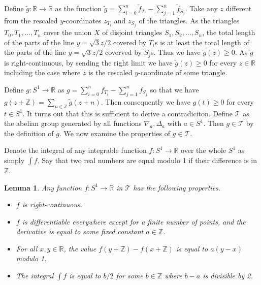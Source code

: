 \documentclass[a4paper]{amsart}
\theoremstyle{plain}
\newtheorem{lemma}{Lemma}
\theoremstyle{definition}
\begin{document}
Define \(\tilde{g} : \mathbb{R} \to \mathbb{R}\) as the function \(\tilde{g} = \sum_{i=0}^n \tilde{f}_{T_i} - \sum_{j=1}^n \tilde{f}_{S_j}\). Take any \(z\) different from the rescaled \(y\)-coordinates \(z_{T_i}\) and \(z_{S_j}\) of the triangles. As the triangles \(T_0, T_1, \dots, T_n\) cover the union \(X\) of disjoint triangles \(S_1, S_2, \dots, S_n\), the total length of the parts of the line \(y = \sqrt{3}z/2\) covered by \(T_i\)\textquotesingle s is at least the total length of the parts of the line \(y = \sqrt{3}z/2\) coverved by \(S_j\)\textquotesingle s. Thus we have \(\tilde{g}(z) \geq 0\). As \(\tilde{g}\) is right-continuous, by sending the right limit we have \(\tilde{g}(z) \geq 0\) for every \(z \in \mathbb{R}\) including the case where \(z\) is the rescaled \(y\)-coordinate of some triangle.

Define \(g : S^1 \to \mathbb{R}\) as \(g = \sum_{i=0}^n f_{T_i} - \sum_{j=1}^n f_{S_j}\) so that we have \(g(z + \mathbb{Z}) = \sum_{n \in \mathbb{Z}} \tilde{g}(z + n)\). Then consequently we have \(g(t) \geq 0\) for every \(t \in S^1\). 
It turns out that this is sufficient to derive a contradiciton.
Define \(\mathcal{T}\) as the abelian group generated by all functions \(\nabla_a , \Delta_a\) with \(a \in S^1\). Then \(g \in \mathcal{T}\) by the definition of \(g\).
We now examine the properties of $g \in \mathcal{T}$.
 
Denote the integral of any integrable function \(f : S^1 \to \mathbb{R}\) over the whole \(S^1\) as simply \(\int f\).
Say that two real numbers are equal modulo 1 if their difference is in $\mathbb{Z}$.

\begin{lemma}

Any function \(f : S^1 \to \mathbb{R}\) in \(\mathcal{T}\) has the following properties.

\begin{itemize}
\item
  \(f\) is right-continuous.
\item
  \(f\) is differentiable everywhere except for a finite number of points, and the derivative is equal to some fixed constant \(a \in \mathbb{Z}\).
\item
  For all \(x, y \in \mathbb{R}\), the value \(f(y + \mathbb{Z}) - f(x + \mathbb{Z})\) is equal to \(a(y - x)\) modulo 1.
\item
  The integral \(\int f\) is equal to \(b / 2\) for some \(b \in \mathbb{Z}\) where \(b - a\) is divisible by 2.
\end{itemize}

\label{lem:triangle-group}
\end{lemma}
\end{document}
